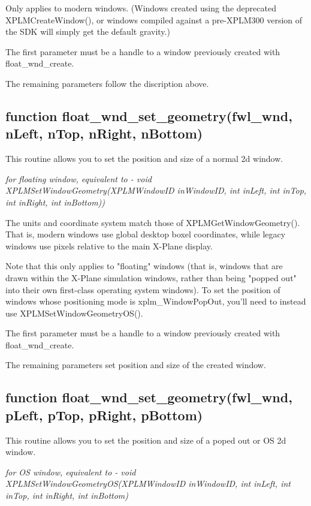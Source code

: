 \documentclass[11pt,parskip=half,a4paper]{scrartcl}
\begin{document}
Only applies to modern windows. (Windows created using the deprecated XPLMCreateWindow(), or windows compiled against a pre-XPLM300 version of the SDK will simply get the default gravity.) 


The first parameter must be a handle to a window previously created with float\_wnd\_create.

The remaining parameters follow the discription above.

\subsection{\hspace*{1.0mm}function float\_wnd\_set\_geometry(fwl\_wnd, nLeft, nTop, nRight, nBottom)}

This routine allows you to set the position and size of a normal 2d window.

\emph{for floating window, equivalent to - void XPLMSetWindowGeometry(XPLMWindowID inWindowID, int inLeft, int inTop, int inRight, int inBottom))}

The units and coordinate system match those of XPLMGetWindowGeometry(). That is, modern windows use global desktop boxel coordinates, while legacy windows use pixels relative to the main X-Plane display.

Note that this only applies to "floating" windows (that is, windows that are drawn within the X-Plane simulation windows, rather than being "popped out" into their own first-class operating system windows). To set the position of windows whose positioning mode is xplm\_WindowPopOut, you'll need to instead use XPLMSetWindowGeometryOS().

The first parameter must be a handle to a window previously created with float\_wnd\_create.

The remaining parameters set position and size of the created window.

\subsection{\hspace*{1.0mm}function float\_wnd\_set\_geometry(fwl\_wnd, pLeft, pTop, pRight, pBottom)}

This routine allows you to set the position and size of a poped out or OS 2d window.

\emph{for OS window, equivalent to       - void XPLMSetWindowGeometryOS(XPLMWindowID inWindowID, int inLeft, int inTop, int inRight, int inBottom)}
\end{document}
